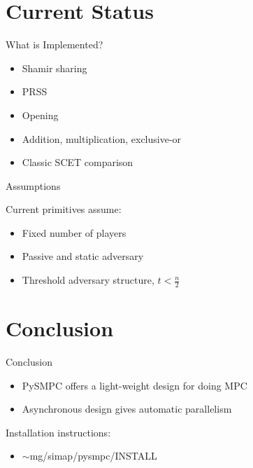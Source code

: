 \documentclass[t,noamsthm]{beamer}
\begin{document}
\section{Current Status}

\begin{frame}{What is Implemented?}
  \begin{itemize}
  \item Shamir sharing
  \item PRSS
  \item Opening
  \item Addition, multiplication, exclusive-or
  \item Classic SCET comparison
  \end{itemize}
\end{frame}


\begin{frame}{Assumptions}
  
  Current primitives assume:
  \begin{itemize}
  \item Fixed number of players
  \item Passive and static adversary
  \item Threshold adversary structure, $t < \frac n 2$
  \end{itemize}

  
\end{frame}

\section{Conclusion}

\begin{frame}{Conclusion}

\begin{itemize}
\item PySMPC offers a light-weight design for doing MPC
\item Asynchronous design gives automatic parallelism
\end{itemize}

Installation instructions:
\begin{itemize}
\item $\sim$mg/simap/pysmpc/INSTALL
\end{itemize}



\end{frame}
\end{document}
